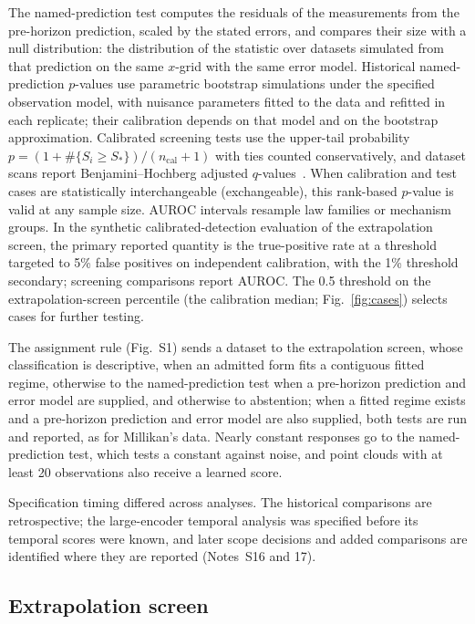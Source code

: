 \documentclass{article}
\begin{document}
The named-prediction test computes the residuals of the measurements from the pre-horizon prediction, scaled by the stated errors, and compares their size with a null distribution: the distribution of the statistic over datasets simulated from that prediction on the same $x$-grid with the same error model. Historical named-prediction $p$-values use parametric bootstrap simulations under the specified observation model, with nuisance parameters fitted to the data and refitted in each replicate; their calibration depends on that model and on the bootstrap approximation. Calibrated screening tests use the upper-tail
probability $p=(1+\#\{S_i\geq S_*\})/(n_{\mathrm{cal}}+1)$ with ties counted
conservatively, and dataset scans report Benjamini--Hochberg adjusted
$q$-values~\cite{benjamini1995fdr}. When calibration and test cases are statistically interchangeable (exchangeable), this rank-based $p$-value is valid at any sample size. AUROC intervals resample law families or mechanism groups. In the synthetic calibrated-detection evaluation of the extrapolation screen, the primary reported quantity is the true-positive rate at a threshold targeted to 5\% false positives on independent calibration,
with the 1\% threshold secondary; screening comparisons report AUROC. The 0.5 threshold on the extrapolation-screen percentile (the calibration median; Fig.~\ref{fig:cases}) selects cases for further testing.

The assignment rule (Fig.~S1) sends a dataset to the extrapolation screen, whose classification is descriptive, when an admitted form fits a contiguous fitted regime, otherwise to the named-prediction test when a pre-horizon prediction and error model are supplied, and otherwise to abstention; when a fitted regime exists and a pre-horizon prediction and error model are also supplied, both tests are run and reported, as for Millikan's data. Nearly constant responses go to the named-prediction test, which tests a constant against noise, and point clouds with at least 20 observations also receive a learned score.

Specification timing differed across analyses. The historical comparisons are retrospective; the large-encoder temporal analysis was specified before its temporal scores were known, and later scope decisions and added comparisons are identified where they are reported (Notes~S16 and 17).

\subsection{Extrapolation screen}
\end{document}
